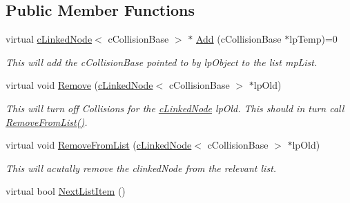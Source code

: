 \subsection*{Public Member Functions}
\begin{DoxyCompactItemize}
\item 
\hypertarget{classc_collision_handler_ab5d406719ed52ec13c8e0248c6b4777f}{
virtual \hyperlink{classc_linked_node}{cLinkedNode}$<$ cCollisionBase $>$ $\ast$ \hyperlink{classc_collision_handler_ab5d406719ed52ec13c8e0248c6b4777f}{Add} (cCollisionBase $\ast$lpTemp)=0}
\label{classc_collision_handler_ab5d406719ed52ec13c8e0248c6b4777f}

\begin{DoxyCompactList}\small\item\em This will add the cCollisionBase pointed to by lpObject to the list mpList. \end{DoxyCompactList}\item 
\hypertarget{classc_collision_handler_a520ca8793fa6c5413e0f0909ba81cffd}{
virtual void \hyperlink{classc_collision_handler_a520ca8793fa6c5413e0f0909ba81cffd}{Remove} (\hyperlink{classc_linked_node}{cLinkedNode}$<$ cCollisionBase $>$ $\ast$lpOld)}
\label{classc_collision_handler_a520ca8793fa6c5413e0f0909ba81cffd}

\begin{DoxyCompactList}\small\item\em This will turn off Collisions for the \hyperlink{classc_linked_node}{cLinkedNode} lpOld. This should in turn call \hyperlink{classc_collision_handler_a8d2e4aa496a4e228a0bccdd1f97ebae9}{RemoveFromList()}. \end{DoxyCompactList}\item 
\hypertarget{classc_collision_handler_a8d2e4aa496a4e228a0bccdd1f97ebae9}{
virtual void \hyperlink{classc_collision_handler_a8d2e4aa496a4e228a0bccdd1f97ebae9}{RemoveFromList} (\hyperlink{classc_linked_node}{cLinkedNode}$<$ cCollisionBase $>$ $\ast$lpOld)}
\label{classc_collision_handler_a8d2e4aa496a4e228a0bccdd1f97ebae9}

\begin{DoxyCompactList}\small\item\em This will acutally remove the clinkedNode from the relevant list. \end{DoxyCompactList}\item 
\hypertarget{classc_collision_handler_a906305fe520cefc195f3948458aba941}{
virtual bool \hyperlink{classc_collision_handler_a906305fe520cefc195f3948458aba941}{NextListItem} ()}
\label{classc_collision_handler_a906305fe520cefc195f3948458aba941}


\end{DoxyCompactItemize}
